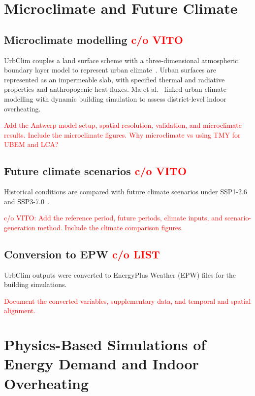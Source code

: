 \documentclass[runningheads]{llncs}
\newcommand{\TODO}[1]{\textcolor{red}{#1}}
\begin{document}
\section{Microclimate and Future Climate}
\label{sec:climate}

\subsection{Microclimate modelling \TODO{c/o VITO}}

UrbClim couples a land surface scheme with a three-dimensional atmospheric boundary layer model to represent urban climate~\cite{DeRidder2015UrbClim}. Urban surfaces are represented as an impermeable slab, with specified thermal and radiative properties and anthropogenic heat fluxes. Ma et al.~\cite{Ma2023Toolchain} linked urban climate modelling with dynamic building simulation to assess district-level indoor overheating.

\TODO{Add the Antwerp model setup, spatial resolution, validation, and microclimate results. Include the microclimate figures. Why microclimate vs using TMY for UBEM and LCA?}

\subsection{Future climate scenarios \TODO{c/o VITO}}

Historical conditions are compared with future climate scenarios under SSP1-2.6 and SSP3-7.0~\cite{IPCC2021WGI}.

\TODO{c/o VITO: Add the reference period, future periods, climate inputs, and scenario-generation method. Include the climate comparison figures.}

\subsection{Conversion to EPW \TODO{c/o LIST}}

UrbClim outputs were converted to EnergyPlus Weather (EPW) files for the building simulations.

\TODO{Document the converted variables, supplementary data, and temporal and spatial alignment.}

\section{Physics-Based Simulations of Energy Demand and Indoor Overheating}
\label{sec:buildings}
\end{document}

